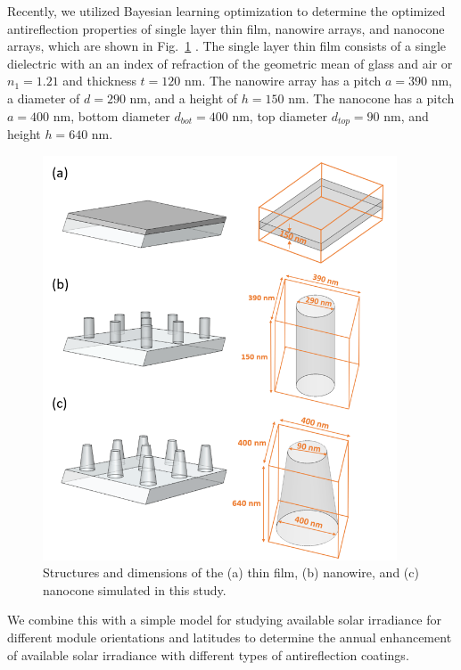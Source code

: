 \documentclass[preprint,12pt]{elsarticle}
\begin{document}
Recently, we utilized Bayesian learning optimization to determine the optimized antireflection properties of single layer thin film, nanowire arrays, and nanocone arrays, which are shown in Fig.~\ref{fig:Structures} \cite{Haghanifar:20}. 
The single layer thin film consists of a single dielectric 
with an an index of refraction of the geometric mean of glass and air or $n_1 = 1.21$ and thickness  $t = 120$ nm. 
The nanowire array has a pitch $a = 390$ nm, a diameter of $d = 290$ nm, and a height of $h = 150$ nm.
The nanocone has a pitch $a = 400$ nm, 
bottom diameter $d_{bot} = 400$ nm, top diameter $d_{top} = 90$ nm, and height $h = 640$ nm.
\begin{figure}[H]
\vspace{-10pt}
 \centering
 \includegraphics[width=10.5cm]{Figures/figure1.png}
\caption{Structures and dimensions of the (a) thin film, (b) nanowire, and (c) nanocone simulated in this study.}
 \label{fig:Structures}
 \end{figure}

We combine this with a simple model for studying available solar irradiance for different module orientations and latitudes
\cite{Sharma:21} to determine the annual enhancement of available solar irradiance with different types of antireflection coatings.  
\end{document}

